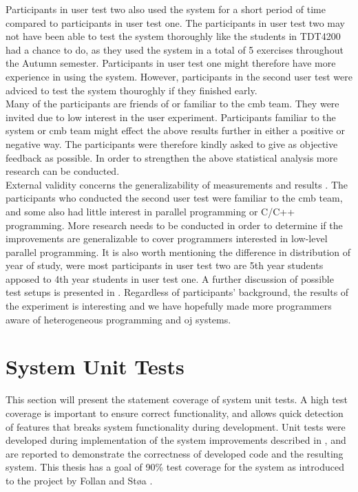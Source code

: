 Participants in user test two also used the system for a short period of time compared to participants in user test one. The participants in user test two may not have been able to test the system thoroughly like the students in TDT4200 had a chance to do, as they used the system in a total of 5 exercises throughout the Autumn semester. Participants in user test one might therefore have more experience in using the system. However, participants in the second user test were adviced to test the system thouroghly if they finished early.\\

Many of the participants are friends of or familiar to the \gls{cmb} team. They were invited due to low interest in the user experiment. Participants familiar to the system or \gls{cmb} team might effect the above results further in either a positive or negative way. The participants were therefore kindly asked to give as objective feedback as possible. In order to strengthen the above statistical analysis more research can be conducted. \\

External validity concerns the generalizability of measurements and results \cite{Oates2006}. The participants who conducted the second user test were familiar to the \gls{cmb} team, and some also had little interest in parallel programming or C/C++ programming. More research needs to be conducted in order to determine if the improvements are generalizable to cover programmers interested in low-level parallel programming. It is also worth mentioning the difference in distribution of year of study, were most participants in user test two are 5th year students apposed to 4th year students in user test one. A further discussion of possible test setups is presented in . Regardless of participants' background, the results of the experiment is interesting and we have hopefully made more programmers aware of heterogeneous programming and \gls{oj} systems. \\

\section{System Unit Tests}
\label{sec:system-unit-tests}
This section will present the statement coverage of system unit tests. A high test coverage is important to ensure correct functionality, and allows quick detection of features that breaks system functionality during development. Unit tests were developed during implementation of the system improvements described in , and are reported to demonstrate the correctness of developed code and the resulting system. This thesis has a goal of 90\% test coverage for the system as introduced to the project by Follan and Støa \cite{mt:T&S}. \\

